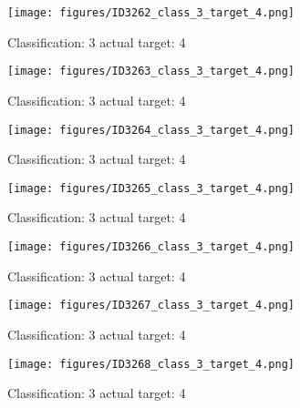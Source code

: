 \begin{figure}[h!]
\begin{center}
\texttt{[image: figures/ID3262\_class\_3\_target\_4.png]}
\end{center}
\caption{ Classification: 3 actual target: 4}
\label{fig:ID3262_class_3_target_4}
\end{figure}
\begin{figure}[h!]
\begin{center}
\texttt{[image: figures/ID3263\_class\_3\_target\_4.png]}
\end{center}
\caption{ Classification: 3 actual target: 4}
\label{fig:ID3263_class_3_target_4}
\end{figure}
\begin{figure}[h!]
\begin{center}
\texttt{[image: figures/ID3264\_class\_3\_target\_4.png]}
\end{center}
\caption{ Classification: 3 actual target: 4}
\label{fig:ID3264_class_3_target_4}
\end{figure}
\begin{figure}[h!]
\begin{center}
\texttt{[image: figures/ID3265\_class\_3\_target\_4.png]}
\end{center}
\caption{ Classification: 3 actual target: 4}
\label{fig:ID3265_class_3_target_4}
\end{figure}
\begin{figure}[h!]
\begin{center}
\texttt{[image: figures/ID3266\_class\_3\_target\_4.png]}
\end{center}
\caption{ Classification: 3 actual target: 4}
\label{fig:ID3266_class_3_target_4}
\end{figure}
\begin{figure}[h!]
\begin{center}
\texttt{[image: figures/ID3267\_class\_3\_target\_4.png]}
\end{center}
\caption{ Classification: 3 actual target: 4}
\label{fig:ID3267_class_3_target_4}
\end{figure}
\begin{figure}[h!]
\begin{center}
\texttt{[image: figures/ID3268\_class\_3\_target\_4.png]}
\end{center}
\caption{ Classification: 3 actual target: 4}
\label{fig:ID3268_class_3_target_4}
\end{figure}
